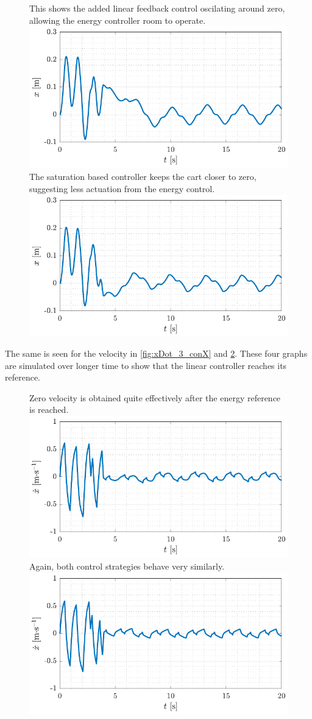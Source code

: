\begin{figure}[H]
  \hspace{-10pt}
  \captionbox
  {
    This shows the added linear feedback control oscilating around zero, allowing the energy controller room to operate.
    \label{fig:x_3_conX}
  }
  {
    \hspace{-1cm}
    \includegraphics[width=.4\textwidth]{figures/x_3_conX}
  }
  \hspace{20pt}
  \captionbox 
  {
    The saturation based controller keeps the cart closer to zero, suggesting less actuation from the energy control.
    \label{fig:x_4_conX}
  }
  {
    \hspace{-1cm}
    \includegraphics[width=.4\textwidth]{figures/x_4_conX}
  }  
\end{figure}
The same is seen for the velocity in \autoref{fig:xDot_3_conX} and \ref{fig:xDot_4_conX}. These four graphs are simulated over longer time to show that the linear controller reaches its reference.
\begin{figure}[H]
  \hspace{-10pt}
  \captionbox
  {
    Zero velocity is obtained quite effectively after the energy reference is reached.
    \label{fig:xDot_3_conX}
  }
  {
    \hspace{-1cm}
    \includegraphics[width=.4\textwidth]{figures/xDot_3_conX}
  }
  \hspace{20pt}
  \captionbox 
  {
    Again, both control strategies behave very similarly.
    \label{fig:xDot_4_conX}
  }
  {
    \hspace{-1cm}
    \includegraphics[width=.4\textwidth]{figures/xDot_4_conX}
  }  
\end{figure}

